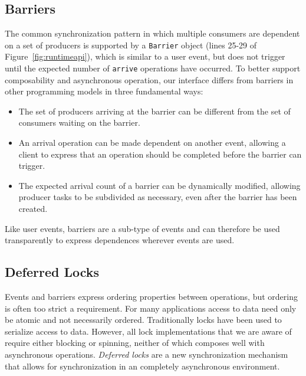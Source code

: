 \subsection{Barriers}
\label{subsec:barriers}
The common synchronization pattern in which multiple consumers are dependent on
a set of producers is supported by a {\tt Barrier} object (lines 25-29 of Figure~\ref{fig:runtimeapi}), which is similar
to a user event, but does not trigger until the expected number of {\tt arrive}
operations have occurred.  To better support
composability and asynchronous operation, our interface differs from barriers in other programming
models\cite{MPI} in three fundamental ways:
\begin{itemize} \itemsep1pt \parskip0pt 
\item The set of producers arriving at the barrier can be different from the set of consumers waiting on the barrier.
\item An arrival operation can be made dependent on another event, allowing a client to
express that an operation should be completed before the barrier can trigger.
\item The expected arrival count of a barrier can be dynamically modified, allowing
producer tasks to be subdivided as necessary, even after the barrier has been created.
\end{itemize}

Like user events, barriers are a sub-type of events and can therefore
be used transparently to express dependences wherever events are used.

\subsection{Deferred Locks}
\label{subsec:locks}

Events and barriers express ordering properties between operations, but 
ordering is often too strict a requirement.  For many applications access to data need only be atomic and
not necessarily ordered.  Traditionally locks have been used to serialize access to
data.  However, all lock implementations that we are aware of require either blocking
or spinning, neither of which composes well with asynchronous operations.
{\em Deferred locks} are a new synchronization mechanism that allows for synchronization
in an completely asynchronous environment.  


